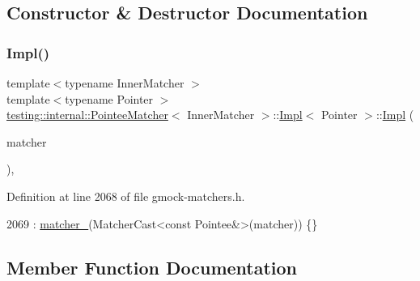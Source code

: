 \subsection{Constructor \& Destructor Documentation}
\mbox{\label{classtesting_1_1internal_1_1PointeeMatcher_1_1Impl_a2f85fb0fee21f4f821562539d79526f7}} 
\subsubsection{\texorpdfstring{Impl()}{Impl()}}
{\footnotesize\ttfamily template$<$typename Inner\+Matcher $>$ \\
template$<$typename Pointer $>$ \\
\hyperlink{classtesting_1_1internal_1_1PointeeMatcher}{testing\+::internal\+::\+Pointee\+Matcher}$<$ Inner\+Matcher $>$\+::\hyperlink{classtesting_1_1internal_1_1PointeeMatcher_1_1Impl}{Impl}$<$ Pointer $>$\+::\hyperlink{classtesting_1_1internal_1_1PointeeMatcher_1_1Impl}{Impl} (\begin{DoxyParamCaption}\item[{const Inner\+Matcher \&}]{matcher }\end{DoxyParamCaption})\hspace{0.3cm}{\ttfamily [inline]}, {\ttfamily [explicit]}}



Definition at line 2068 of file gmock-\/matchers.\+h.


\begin{DoxyCode}
2069         : \hyperlink{classtesting_1_1internal_1_1PointeeMatcher_1_1Impl_a8b6095eca981f76156d7e301cef455a0}{matcher\_}(MatcherCast<const Pointee&>(matcher)) \{\}
\end{DoxyCode}


\subsection{Member Function Documentation}
\mbox{\label{classtesting_1_1internal_1_1PointeeMatcher_1_1Impl_af37adcdf3e5218ca9e1954515bc135c8}} 
